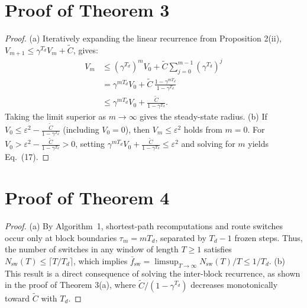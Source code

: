 \documentclass[11pt]{article}
\newcommand{\rev}[1]{#1}
\newenvironment{IEEEproof}{\begin{proof}}{\end{proof}}
\begin{document}
\section{Proof of Theorem 3}
\label{app:proof_thm_epsilon_tube}
\begin{IEEEproof}
(a) Iteratively expanding the linear recurrence from Proposition 2(ii), $V_{m+1}\le \gamma^{T_d}V_m+\tilde C$, gives:
\begin{equation}
\begin{split}
V_m &\le (\gamma^{T_d})^m V_0 + \tilde C \sum_{j=0}^{m-1}(\gamma^{T_d})^j \\
    &= \gamma^{mT_d}V_0 + \tilde C\,\frac{1-\gamma^{mT_d}}{1-\gamma^{T_d}} \\
    &\le \gamma^{mT_d}V_0+\frac{\tilde C}{1-\gamma^{T_d}}.
\end{split}
\end{equation}
Taking the limit superior as $m\to\infty$ gives the steady-state radius.
(b) \rev{If $V_0 \le \varepsilon^2 - \frac{\tilde C}{1-\gamma^{T_d}}$ (including $V_0 = 0$), then $V_m \le \varepsilon^2$ holds from $m=0$. For $V_0 > \varepsilon^2 - \frac{\tilde C}{1-\gamma^{T_d}} > 0$, setting $\gamma^{mT_d}V_0 + \frac{\tilde C}{1-\gamma^{T_d}} \le \varepsilon^2$ and solving for $m$ yields Eq.~(17).}
\end{IEEEproof}

\section{Proof of Theorem 4}
\label{app:proof_thm_practical_stability}
\begin{IEEEproof}
(a) \rev{By Algorithm~1, shortest-path recomputations and route switches occur only at block boundaries $\tau_m = m T_d$, separated by $T_d - 1$ frozen steps. Thus, the number of switches in any window of length $T \ge 1$ satisfies $N_{\text{sw}}(T) \le \lceil T / T_d \rceil$, which implies $\bar{f}_{\text{sw}} = \limsup_{T\to\infty} N_{\text{sw}}(T)/T \le 1/T_d$.}
(b) This result is a direct consequence of solving the inter-block recurrence, as shown in the proof of Theorem 3(a), where $\tilde{C}/(1-\gamma^{T_d})$ decreases monotonically toward $\tilde{C}$ with $T_d$.
\end{IEEEproof}

\end{document}
